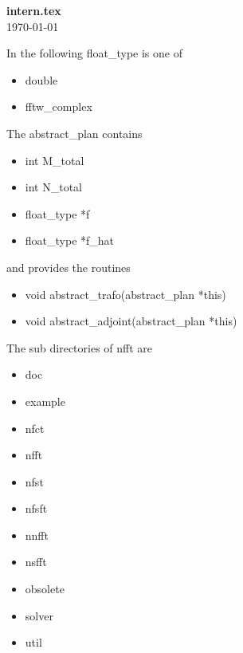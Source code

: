 \documentclass[11pt,a4paper,twoside]{article}
\begin{document}
\begin{center}
{\bf \large intern.tex}\\
\today
\end{center}

In the following float\_type is one of
\begin{itemize}
 \item double
 \item fftw\_complex
\end{itemize}

The abstract\_plan contains
\begin{itemize}
 \item int M\_total
 \item int N\_total
 \item float\_type *f
 \item float\_type *f\_hat
\end{itemize}
and provides the routines
\begin{itemize}
 \item void abstract\_trafo(abstract\_plan *this)
 \item void abstract\_adjoint(abstract\_plan *this)
\end{itemize}

The sub directories of nfft are
\begin{itemize}
 \item doc
 \item example
 \item nfct
 \item nfft
 \item nfst
 \item nfsft
 \item nnfft
 \item nsfft
 \item obsolete
 \item solver
 \item util
\end{itemize}
\end{document}
